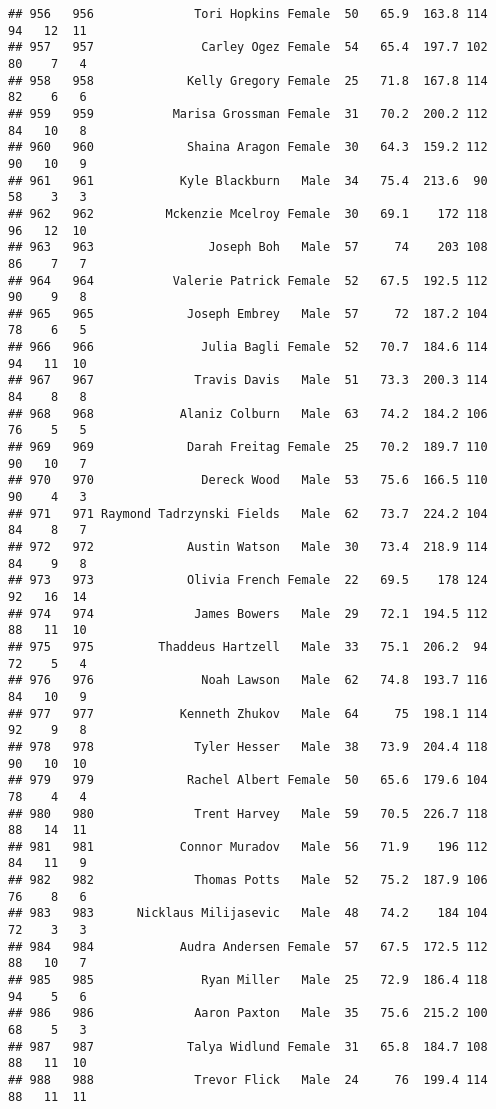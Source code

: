 \documentclass[
]{article}
\begin{document}
\begin{verbatim}
## 956   956              Tori Hopkins Female  50   65.9  163.8 114  94   12  11
## 957   957               Carley Ogez Female  54   65.4  197.7 102  80    7   4
## 958   958             Kelly Gregory Female  25   71.8  167.8 114  82    6   6
## 959   959           Marisa Grossman Female  31   70.2  200.2 112  84   10   8
## 960   960             Shaina Aragon Female  30   64.3  159.2 112  90   10   9
## 961   961            Kyle Blackburn   Male  34   75.4  213.6  90  58    3   3
## 962   962          Mckenzie Mcelroy Female  30   69.1    172 118  96   12  10
## 963   963                Joseph Boh   Male  57     74    203 108  86    7   7
## 964   964           Valerie Patrick Female  52   67.5  192.5 112  90    9   8
## 965   965             Joseph Embrey   Male  57     72  187.2 104  78    6   5
## 966   966               Julia Bagli Female  52   70.7  184.6 114  94   11  10
## 967   967              Travis Davis   Male  51   73.3  200.3 114  84    8   8
## 968   968            Alaniz Colburn   Male  63   74.2  184.2 106  76    5   5
## 969   969             Darah Freitag Female  25   70.2  189.7 110  90   10   7
## 970   970               Dereck Wood   Male  53   75.6  166.5 110  90    4   3
## 971   971 Raymond Tadrzynski Fields   Male  62   73.7  224.2 104  84    8   7
## 972   972             Austin Watson   Male  30   73.4  218.9 114  84    9   8
## 973   973             Olivia French Female  22   69.5    178 124  92   16  14
## 974   974              James Bowers   Male  29   72.1  194.5 112  88   11  10
## 975   975         Thaddeus Hartzell   Male  33   75.1  206.2  94  72    5   4
## 976   976               Noah Lawson   Male  62   74.8  193.7 116  84   10   9
## 977   977            Kenneth Zhukov   Male  64     75  198.1 114  92    9   8
## 978   978              Tyler Hesser   Male  38   73.9  204.4 118  90   10  10
## 979   979             Rachel Albert Female  50   65.6  179.6 104  78    4   4
## 980   980              Trent Harvey   Male  59   70.5  226.7 118  88   14  11
## 981   981            Connor Muradov   Male  56   71.9    196 112  84   11   9
## 982   982              Thomas Potts   Male  52   75.2  187.9 106  76    8   6
## 983   983      Nicklaus Milijasevic   Male  48   74.2    184 104  72    3   3
## 984   984            Audra Andersen Female  57   67.5  172.5 112  88   10   7
## 985   985               Ryan Miller   Male  25   72.9  186.4 118  94    5   6
## 986   986              Aaron Paxton   Male  35   75.6  215.2 100  68    5   3
## 987   987             Talya Widlund Female  31   65.8  184.7 108  88   11  10
## 988   988              Trevor Flick   Male  24     76  199.4 114  88   11  11

\end{verbatim}
\end{document}
